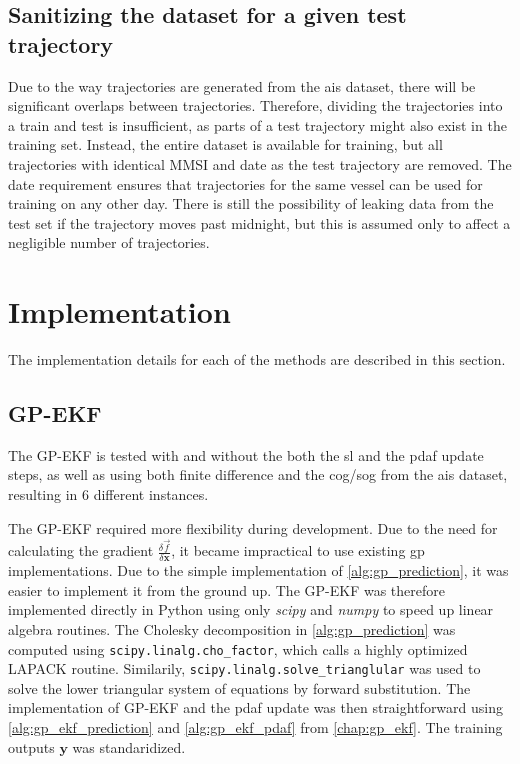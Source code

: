 \subsection{Sanitizing the dataset for a given test trajectory}
Due to the way trajectories are generated from the \acrshort{ais} dataset, there will be significant overlaps between trajectories. Therefore, dividing the trajectories into a train and test is insufficient, as parts of a test trajectory might also exist in the training set. Instead, the entire dataset is available for training, but all trajectories with identical MMSI and date as the test trajectory are removed. The date requirement ensures that trajectories for the same vessel can be used for training on any other day. There is still the possibility of leaking data from the test set if the trajectory moves past midnight, but this is assumed only to affect a negligible number of trajectories.


\section{Implementation}
The implementation details for each of the methods are described in this section.

\subsection{GP-EKF}
The GP-EKF is tested with and without the both the \acrshort{sl} and the \acrshort{pdaf} update steps, as well as using both finite difference and the \acrshort{cog}/\acrshort{sog} from the \acrshort{ais} dataset, resulting in $6$ different instances.

The GP-EKF required more flexibility during development. Due to the need for calculating the gradient $\frac{\delta \vec{f}}{\delta \boldsymbol{x}}$, it became impractical to use existing \acrshort{gp} implementations. Due to the simple implementation of \cref{alg:gp_prediction}, it was easier to implement it from the ground up.
The GP-EKF was therefore implemented directly in Python using only \textit{scipy}\cite{scipy} and \textit{numpy}\cite{numpy} to speed up linear algebra routines. The Cholesky decomposition in \cref{alg:gp_prediction} was computed using \texttt{scipy.linalg.cho\_factor}, which calls a highly optimized LAPACK routine. Similarily, \texttt{scipy.linalg.solve\_\-trianglular} was used to solve the lower triangular system of equations by forward substitution. The implementation of GP-EKF and the \acrshort{pdaf} update was then straightforward using \cref{alg:gp_ekf_prediction} and \cref{alg:gp_ekf_pdaf} from \cref{chap:gp_ekf}. The training outputs $\boldsymbol{y}$ was standaridized.

